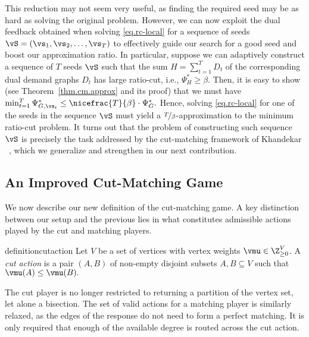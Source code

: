 \documentclass[letterpaper]{article}
\begin{document}
This reduction may not seem very useful, as finding the required seed may be as hard as solving the original problem.
However, we can now exploit the dual feedback obtained when solving \eqref{eq.rc-local} for a sequence of seeds $ \vS = (\vs_1, \vs_2, \ldots, \vs_T)$ to effectively guide our search for a good seed and boost our approximation ratio.
In particular, suppose we can adaptively construct a sequence of $T$ seeds $\vS$ such that the sum $H =\sum_{t=1}^T D_t$
of the corresponding dual demand graphs $D_t$ has large ratio-cut, i.e., $\Psi_H^* \geq \beta.$  Then, it is easy to show (see Theorem~\ref{thm.cm.approx} and its proof) that we must have $\min_{t=1}^T \Psi^*_{G,\vs_t} \leq \nicefrac{T}{\beta} \cdot \Psi^*_G .$ Hence, solving \eqref{eq.rc-local} for one of the seeds in the sequence $\vS$ must yield a $\nicefrac{T}{\beta}$-approximation to the minimum ratio-cut problem.
It turns out that the problem of constructing such sequence $\vS$ is precisely the task addressed by the cut-matching framework of Khandekar \etal~\cite{khandekarGraphPartitioningUsing2009}, which we generalize and strengthen in our next contribution.


\subsection{An Improved Cut-Matching Game}
\label{sec.results.cm}

We now describe our new definition of the cut-matching game.
A key distinction between our setup and the previous lies in what constitutes admissible actions played by the cut and matching players.


\begin{restatable}{definition}{cutaction}\label{def.cut-action}
Let $V$ be a set of vertices with vertex weights $\vmu \in \Z^{V}_{\geq 0}$. A {\it cut action} is a pair $(A, B)$ of non-empty disjoint subsets $A, B \subseteq V$ such that $\vmu(A) \leq \vmu(B).$
\end{restatable}

\noindent
The cut player is no longer restricted to returning a partition of the vertex set, let alone a bisection. The set of valid actions for a matching player is similarly relaxed, as the edges of the response do not need to form a perfect matching. It is only required that enough of the available degree is routed across the cut action.
\end{document}

